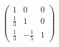 \documentclass[preview]{standalone}
\begin{document}
\begin{align*}
\begin{pmatrix}1 & 0 & 0\\\frac{1}{3} & 1 & 0\\\frac{1}{3} & -\frac{1}{5} & 1\end{pmatrix}
\end{align*}
\end{document}
